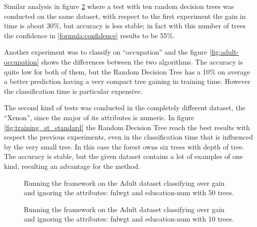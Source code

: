 \documentclass{acm_proc_article-sp-sigmod07}
\begin{document}
Similar analysis in figure \ref{fig:adult-10} where a test with ten
random decision trees was conducted on the same dataset, with respect to
the first experiment the gain in time is about 30\%, but accuracy is less
stable; in fact with this number of trees the confidence in
\ref{formula:confidence} results to be 55\%.

Another experiment was to classify on ``occupation'' and the figure
\ref{fig:adult-occupation} shows the differences between the two
algorithms. The accuracy is quite low for both of them, but the Random
Decision Tree has a 10\% on average a better prediction having a very
compact tree gaining in training time. However the classification time is
particular expensive.

The second kind of tests was conducted in the completely different
dataset, the ``Xenon'', since the major of its attributes is numeric.
In figure \ref{fig:training_st_standard} the Random Decision Tree reach
the best results with respect the previous experiments, even in the
classification time that is influenced by the very small tree. In this
case the forest owns six trees with depth of tree. The accuracy is stable,
but the given dataset contains a lot of examples of one kind, resulting an
advantage for the method.

\begin{figure*}
\label{fig:adult_standard}
\centering
{}
\caption{Running the framework on the Adult dataset classifying over gain
and ignoring the attributes: fnlwgt and education-num.}
\end{figure*}

\begin{figure}
\label{fig:adult-50}
\centering
{}
\caption{Running the framework on the Adult dataset classifying over gain
and ignoring the attributes: fnlwgt and education-num with 50 trees.}
\end{figure}

\begin{figure}
\label{fig:adult-10}
\centering
{}
\caption{Running the framework on the Adult dataset classifying over gain
and ignoring the attributes: fnlwgt and education-num with 10 trees.}
\end{figure}
\end{document}
